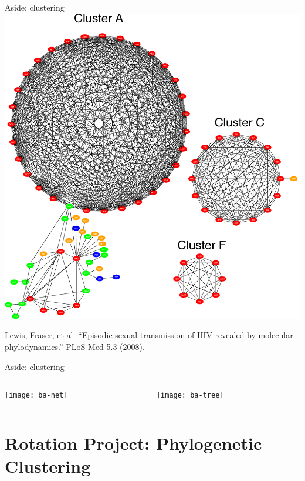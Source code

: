 \documentclass{beamer}
\begin{document}
\begin{frame}{Aside: clustering}
    \includegraphics[scale=0.7]{f3b}

    \tiny{Lewis, Fraser, et al. ``Episodic sexual transmission of HIV revealed by molecular phylodynamics.'' PLoS Med 5.3 (2008).}
\end{frame}

\begin{frame}{Aside: clustering}
    \begin{columns}
        \begin{column}{0.5\textwidth}
            \texttt{[image: ba-net]}
        \end{column}
        \begin{column}{0.5\textwidth}
            \texttt{[image: ba-tree]}
        \end{column}
    \end{columns}
\end{frame}

\section{Rotation Project: Phylogenetic Clustering}
\end{document}
